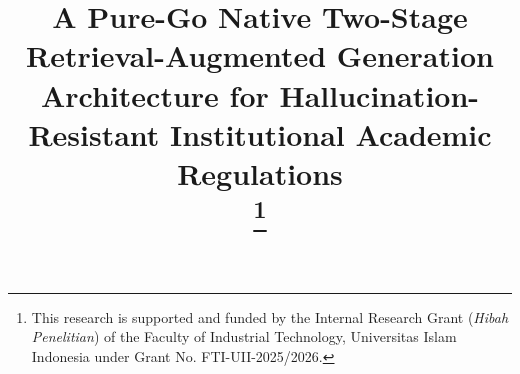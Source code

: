 \documentclass[conference]{IEEEtran}
\begin{document}
\title{A Pure-Go Native Two-Stage Retrieval-Augmented Generation Architecture for Hallucination-Resistant Institutional Academic Regulations\\
\thanks{This research is supported and funded by the Internal Research Grant (\textit{Hibah Penelitian}) of the Faculty of Industrial Technology, Universitas Islam Indonesia under Grant No. FTI-UII-2025/2026.}
}

\author{
\and
{}
}

\maketitle
\end{document}
